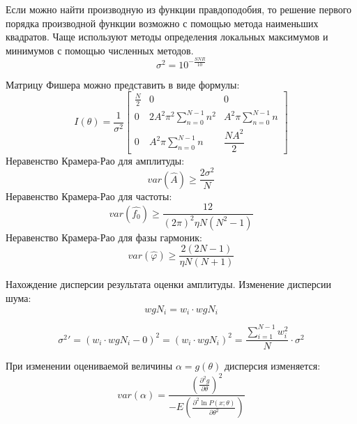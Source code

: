 Если можно найти производную из функции правдоподобия, то решение первого порядка производной функции возможно с помощью метода наименьших квадратов. Чаще используют методы определения локальных максимумов и минимумов с помощью численных методов.
\begin{equation}
	\label{eq:equation1.4.1}
	\sigma^2 = 10^{- \frac{SNR}{10}}
\end{equation}

Матрицу Фишера можно представить в виде формулы:
\begin{equation}
	\label{eq:equation15}
	I(\theta) = \frac{1}{\sigma^2}
	\begin{bmatrix}
		\frac{N}{2} & 0 & 0 \\
		0 & 2A^2 \pi^2 \displaystyle\sum_{n=0}^{N-1} n^2 & A^2 \pi \displaystyle\sum_{n=0}^{N-1} n \\
		0 & A^2 \pi \displaystyle\sum_{n=0}^{N-1} n & \dfrac{NA^2}{2}
	\end{bmatrix}
\end{equation}
Неравенство Крамера-Рао для амплитуды:
\begin{equation}
	\label{eq:equation16}
	var(\hat{A})\geq \frac{2  \sigma^2}{N} 
\end{equation}
Неравенство Крамера-Рао для частоты:
\begin{equation}
	\label{eq:equation17}
	var(\hat{f_0})\geq \frac{12}{(2\pi)^2 \eta  N(N^2 - 1)}  
\end{equation}
Неравенство Крамера-Рао для фазы гармоник:
\begin{equation}
	\label{eq:equation18}
	var(\hat{\varphi})\geq \frac{2(2N-1)}{\eta N(N+1)}  
\end{equation}

Нахождение дисперсии результата оценки амплитуды. Изменение дисперсии шума:
\begin{equation}
	\label{eq:equation19}
	w g N_i = w_i \cdot w g N_i
\end{equation}

\begin{equation}
	\label{eq:equation19}
{\sigma^2}' = (w_i \cdot w g N_i - 0)^2 = (w_i \cdot w g N_i)^2 =\frac{\displaystyle\sum_{i=1}^{N-1} w_i^2}{N} \cdot \sigma^2
\end{equation}

При изменении оцениваемой величины $\alpha=g(\theta)$ дисперсия изменяется:
\begin{equation}
	\label{eq:equation19}
	var (\alpha) = \frac{ \left({\frac{\partial^2 g}{\partial \theta}}\right)^2}{-E \left(\frac{\partial ^2 \ln P(x; \theta)}{\partial \theta^2} \right) }
\end{equation}

